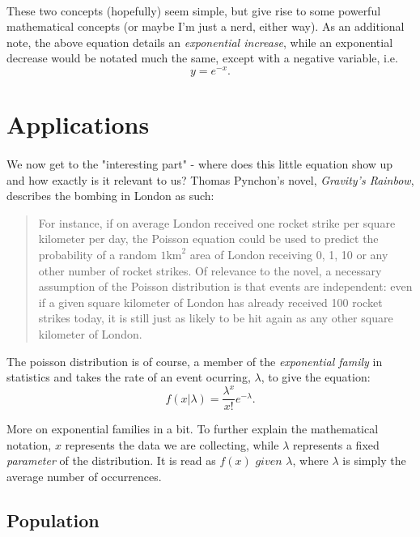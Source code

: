 \documentclass{cup-pan}
\begin{document}
\paragraph{} 
These two concepts (hopefully) seem simple, but give rise to some powerful mathematical concepts (or maybe I'm just a nerd, either way). As an additional note, the above equation details an \textit{exponential increase}, while an exponential decrease would be notated much the same, except with a negative variable, i.e. $$y = \textit{e}^{-x}.$$

\section{Applications}
\label{sec:apps}

\paragraph{}
We now get to the "interesting part" - where does this little equation show up and how exactly is it relevant to us? Thomas Pynchon's novel, \textit{Gravity's Rainbow}, describes the bombing in London as such:

\begin{quote}
For instance, if on average London received one rocket strike per square kilometer per day, the Poisson equation could be used to predict the probability of a random $1 \text{km}^2$ area of London receiving 0, 1, 10 or any other number of rocket strikes. Of relevance to the novel, a necessary assumption of the Poisson distribution is that events are independent: even if a given square kilometer of London has already received 100 rocket strikes today, it is still just as likely to be hit again as any other square kilometer of London.
\end{quote}

The poisson distribution is of course, a member of the \textit{exponential family} in statistics and takes the rate of an event ocurring, $\lambda$, to give the equation: $$f(x| \lambda) = \frac{\lambda^x}{x!} \textit{e}^{-\lambda}.$$

More on exponential families in a bit. To further explain the mathematical notation, $x$ represents the data we are collecting, while $\lambda$ represents a fixed \textit{parameter} of the distribution. It is read as $f(x) \textit{ given } \lambda$, where $\lambda$ is simply the average number of occurrences.

\subsection{Population}
\end{document}
